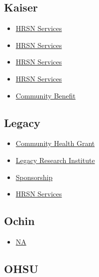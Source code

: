 \documentclass[
  letterpaper,
  DIV=11,
  numbers=noendperiod]{scrreprt}
\providecommand{\tightlist}{%
  \setlength{\itemsep}{0pt}\setlength{\parskip}{0pt}}\usepackage{longtable,booktabs,array}
\begin{document}
\subsection{Kaiser}\label{kaiser}

\begin{itemize}
\tightlist
\item
  \href{Laura.J.Howard@kp.org}{HRSN Services}
\item
  \href{https://communityhealth-midatlantic.kaiserpermanente.org/improving-communities/grantmaking/}{HRSN
  Services}
\item
  \href{https://communityhealth-midatlantic.kaiserpermanente.org/wp-content/uploads/2024/02/LOI-Submitter-Help-Document_508.pdf}{HRSN
  Services}
\item
  \href{MedicaidHRSflexfunds@kp.org}{HRSN Services}
\item
  \href{community.benefit@kp.org}{Community Benefit}
\end{itemize}

\subsection{Legacy}\label{legacy}

\begin{itemize}
\tightlist
\item
  \href{https://www.legacyhealth.org/Giving-and-Support/community-engagement/Community-Grants}{Community
  Health Grant}
\item
  \href{https://www.legacyhealth.org/For-Health-Professionals/legacy-research-institute/services/grants}{Legacy
  Research Institute}
\item
  \href{https://www.legacyhealth.org/Giving-and-Support/community-engagement/Sponsorships}{Sponsorship}
\item
  \href{HealthRelatedServices@pacificsource.com}{HRSN Services}
\end{itemize}

\subsection{Ochin}\label{ochin}

\begin{itemize}
\tightlist
\item
  \url{NA}
\end{itemize}

\subsection{OHSU}\label{ohsu}
\end{document}
